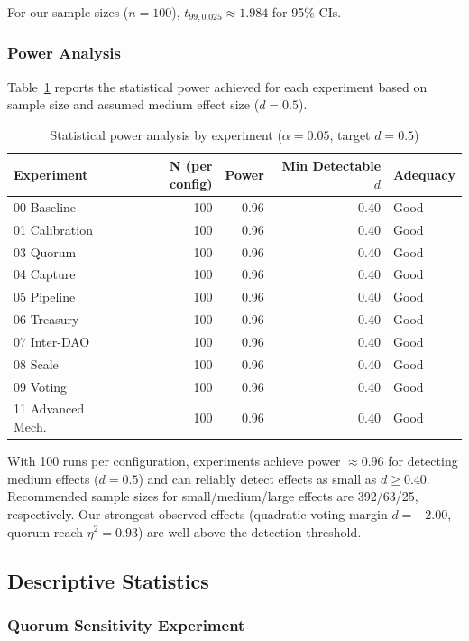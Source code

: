 For our sample sizes ($n = 100$), $t_{99, 0.025} \approx 1.984$ for 95\% CIs.

\subsubsection{Power Analysis}

Table~\ref{tab:power-analysis} reports the statistical power achieved for each experiment based on sample size and assumed medium effect size ($d = 0.5$).

\begin{table}[htbp]
\centering
\caption{Statistical power analysis by experiment ($\alpha = 0.05$, target $d = 0.5$)}
\label{tab:power-analysis}
\small
\begin{tabular}{@{}lrrrl@{}}
\toprule
Experiment & N (per config) & Power & Min Detectable $d$ & Adequacy \\
\midrule
00 Baseline & 100 & 0.96 & 0.40 & Good \\
01 Calibration & 100 & 0.96 & 0.40 & Good \\
03 Quorum & 100 & 0.96 & 0.40 & Good \\
04 Capture & 100 & 0.96 & 0.40 & Good \\
05 Pipeline & 100 & 0.96 & 0.40 & Good \\
06 Treasury & 100 & 0.96 & 0.40 & Good \\
07 Inter-DAO & 100 & 0.96 & 0.40 & Good \\
08 Scale & 100 & 0.96 & 0.40 & Good \\
09 Voting & 100 & 0.96 & 0.40 & Good \\
11 Advanced Mech. & 100 & 0.96 & 0.40 & Good \\
\bottomrule
\end{tabular}
\end{table}

With 100 runs per configuration, experiments achieve power $\approx 0.96$ for detecting medium effects ($d = 0.5$) and can reliably detect effects as small as $d \geq 0.40$. Recommended sample sizes for small/medium/large effects are 392/63/25, respectively. Our strongest observed effects (quadratic voting margin $d = -2.00$, quorum reach $\eta^2 = 0.93$) are well above the detection threshold.

\subsection{Descriptive Statistics}

\subsubsection{Quorum Sensitivity Experiment}

